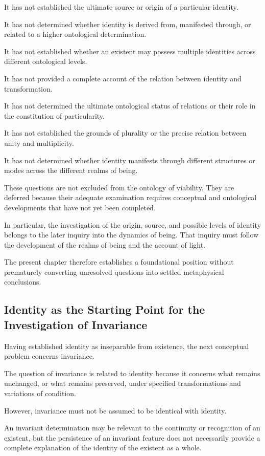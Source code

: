 It has not established the ultimate source or origin of a particular identity.

It has not determined whether identity is derived from, manifested through, or related to a higher ontological determination.

It has not established whether an existent may possess multiple identities across different ontological levels.

It has not provided a complete account of the relation between identity and transformation.

It has not determined the ultimate ontological status of relations or their role in the constitution of particularity.

It has not established the grounds of plurality or the precise relation between unity and multiplicity.

It has not determined whether identity manifests through different structures or modes across the different realms of being.

These questions are not excluded from the ontology of viability. They are deferred because their adequate examination requires conceptual and ontological developments that have not yet been completed.

In particular, the investigation of the origin, source, and possible levels of identity belongs to the later inquiry into the dynamics of being. That inquiry must follow the development of the realms of being and the account of light.

The present chapter therefore establishes a foundational position without prematurely converting unresolved questions into settled metaphysical conclusions.

\subsection{Identity as the Starting Point for the Investigation of Invariance}

Having established identity as inseparable from existence, the next conceptual problem concerns invariance.

The question of invariance is related to identity because it concerns what remains unchanged, or what remains preserved, under specified transformations and variations of condition.

However, invariance must not be assumed to be identical with identity.

An invariant determination may be relevant to the continuity or recognition of an existent, but the persistence of an invariant feature does not necessarily provide a complete explanation of the identity of the existent as a whole.

